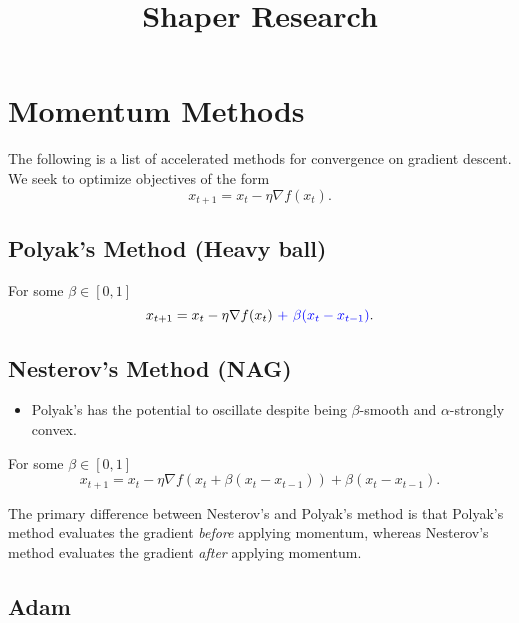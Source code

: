 \documentclass{article}
\title{Shaper Research}
\begin{document}
\maketitle

\section{Momentum Methods}

The following is a list of accelerated methods for convergence on gradient
descent. We seek to optimize objectives of the form
\begin{equation}
    x_{t + 1} = x_t - \eta \nabla f(x_t).
\end{equation}

\subsection{Polyak's Method (Heavy ball)}

For some $\beta \in [0, 1]$
\begin{equation}
    x_{t + 1} = x_t - \eta \nabla f(x_t) {\color{blue}\ +\ \beta (x_t - x_{t -
    1})}.
\end{equation}

\subsection{Nesterov's Method (NAG)}

\begin{itemize}
    \item Polyak's has the potential to oscillate \cite{lessard2016analysis}
        despite being $\beta$-smooth and $\alpha$-strongly convex.
\end{itemize}

For some $\beta \in [0, 1]$
\begin{equation}
    x_{t + 1} = x_t - \eta \nabla f(x_t + \beta (x_t - x_{t - 1})) + \beta (x_t - x_{t - 1}).
\end{equation}

The primary difference between Nesterov's and Polyak's method is that Polyak's
method evaluates the gradient \emph{before} applying momentum, whereas
Nesterov's method evaluates the gradient \emph{after} applying momentum.

\subsection{Adam}



\end{document}
